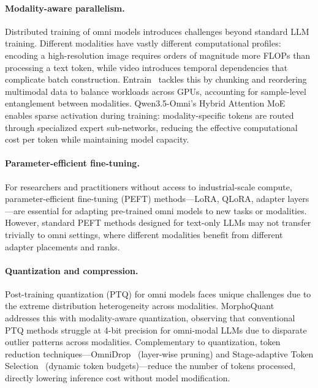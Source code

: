 \documentclass{article}
\begin{document}
\paragraph{Modality-aware parallelism.}
Distributed training of omni models introduces challenges beyond standard LLM training.
Different modalities have vastly different computational profiles: encoding a high-resolution image requires orders of magnitude more FLOPs than processing a text token, while video introduces temporal dependencies that complicate batch construction.
Entrain~\cite{placeholder2026entrain} tackles this by chunking and reordering multimodal data to balance workloads across GPUs, accounting for sample-level entanglement between modalities.
Qwen3.5-Omni's Hybrid Attention MoE~\cite{qwen2026omni} enables sparse activation during training: modality-specific tokens are routed through specialized expert sub-networks, reducing the effective computational cost per token while maintaining model capacity.

\paragraph{Parameter-efficient fine-tuning.}
For researchers and practitioners without access to industrial-scale compute, parameter-efficient fine-tuning (PEFT) methods---LoRA, QLoRA, adapter layers---are essential for adapting pre-trained omni models to new tasks or modalities.
However, standard PEFT methods designed for text-only LLMs may not transfer trivially to omni settings, where different modalities benefit from different adapter placements and ranks.

\paragraph{Quantization and compression.}
Post-training quantization (PTQ) for omni models faces unique challenges due to the extreme distribution heterogeneity across modalities.
MorphoQuant~\cite{placeholder2025morphoquant} addresses this with modality-aware quantization, observing that conventional PTQ methods struggle at 4-bit precision for omni-modal LLMs due to disparate outlier patterns across modalities.
Complementary to quantization, token reduction techniques---OmniDrop~\cite{placeholder2026omnidrop} (layer-wise pruning) and Stage-adaptive Token Selection~\cite{placeholder2026stageadaptive} (dynamic token budgets)---reduce the number of tokens processed, directly lowering inference cost without model modification.
\end{document}
